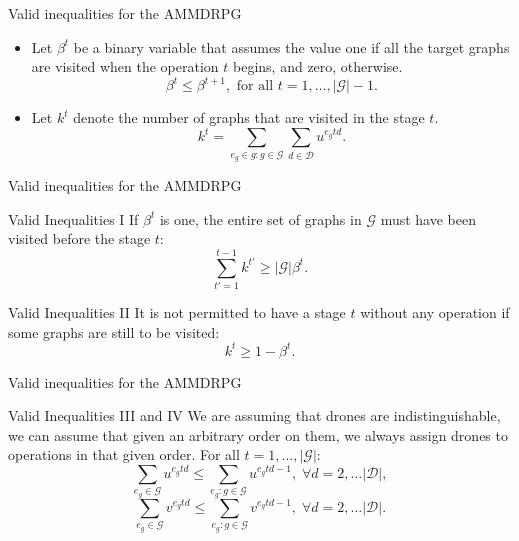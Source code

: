 \documentclass[slidestop,usepdftitle=false,10pt]{beamer}
\begin{document}
	\begin{frame}{Valid inequalities for the AMMDRPG}
	\begin{itemize}
	    \item Let $\beta^t$ be a binary variable that assumes the value one if all the target graphs are visited when the operation $t$ begins, and  zero, otherwise.
	    \begin{equation}\tag{Monotonicity}\label{eq:Monotonicity}
            \beta^t \leq \beta^{t+1}, \mbox{ for all } t=1,\ldots, |\mathcal{G}|-1.
        \end{equation}
	    \item Let $k^t$ denote the number of graphs that are visited in the stage $t$. 
	    $$k^t=\sum_{e_g\in g:g\in\mathcal G}\sum_{d\in\mathcal D} u^{e_gtd}.$$
	\end{itemize}
	\end{frame}
	
	\begin{frame}{Valid inequalities for the AMMDRPG}
	    \begin{block}{Valid Inequalities I}
	    If $\beta^t$ is one, the entire set of graphs in $\mathcal G$ must have been visited before the stage $t$:
            \begin{equation}\tag{VI-1}\label{eq:VI-1}
            \sum_{t'=1}^{t-1} k^{t'} \geq |\mathcal G|\beta^t.
            \end{equation}
        \end{block}
        
        \begin{block}{Valid Inequalities II}
        It is not permitted to have a stage $t$ without any operation if some graphs are still to be visited:
            \begin{equation}\tag{VI-2}\label{eq:VI-2}
            k^t \geq 1 - \beta^t.
            \end{equation}
        \end{block}
    \end{frame}
    
    \begin{frame}{Valid inequalities for the AMMDRPG}
        \begin{block}{Valid Inequalities III and IV}
        We are assuming that drones are indistinguishable, we can assume that given an arbitrary order on them, we always assign drones to operations in that given order. For all $t=1,\ldots,|\mathcal G|:$
        \begin{equation}\tag{VI-3}\label{eq:VI-3}
        \sum_{e_g\in \mathcal G} u^{e_gtd} \leq \sum_{e_g:g\in\mathcal G}u^{e_gtd-1}, \; \forall d=2,\ldots |\mathcal D|,      
        \end{equation}
        \begin{equation}\tag{VI-4}\label{eq:VI-4}
        \sum_{e_g\in \mathcal G} v^{e_gtd} \leq \sum_{e_g:g\in\mathcal G}v^{e_gtd-1}, \; \forall d=2,\ldots |\mathcal D|.      
        \end{equation}
        \end{block}
    \end{frame}
	
\end{document}
